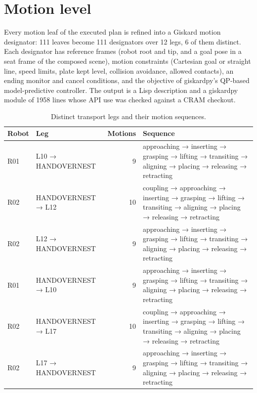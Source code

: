 \documentclass[10pt,a4paper]{article}
\begin{document}
\section{Motion level}\label{sec:motion}

Every motion leaf of the executed plan is refined into a Giskard motion designator: 111 leaves become 111 designators over 12 legs, 6 of them distinct. Each designator has reference frames (robot root and tip, and a goal pose in a seat frame of the composed scene), motion constraints (Cartesian goal or straight line, speed limits, plate kept level, collision avoidance, allowed contacts), an ending monitor and cancel conditions, and the objective of giskardpy's QP-based model-predictive controller. The output is a Lisp description and a giskardpy module of 1958 lines whose API use was checked against a CRAM checkout.

\begin{table}[tbp]\centering\small
\caption{Distinct transport legs and their motion sequences.}\label{tab:legs}
\begin{tabularx}{\linewidth}{llrX}\toprule
\textbf{Robot} & \textbf{Leg} & \textbf{Motions} & \textbf{Sequence} \\\midrule
R01 & L10 → HANDOVERNEST & 9 & approaching → inserting → grasping → lifting → transiting → aligning → placing → releasing → retracting \\
R02 & HANDOVERNEST → L12 & 10 & coupling → approaching → inserting → grasping → lifting → transiting → aligning → placing → releasing → retracting \\
R02 & L12 → HANDOVERNEST & 9 & approaching → inserting → grasping → lifting → transiting → aligning → placing → releasing → retracting \\
R01 & HANDOVERNEST → L10 & 9 & approaching → inserting → grasping → lifting → transiting → aligning → placing → releasing → retracting \\
R02 & HANDOVERNEST → L17 & 10 & coupling → approaching → inserting → grasping → lifting → transiting → aligning → placing → releasing → retracting \\
R02 & L17 → HANDOVERNEST & 9 & approaching → inserting → grasping → lifting → transiting → aligning → placing → releasing → retracting \\\bottomrule
\end{tabularx}
\end{table}
\end{document}
